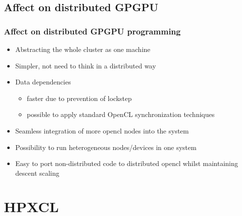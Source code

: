 \documentclass{beamer}
\begin{document}
\subsection{Affect on distributed GPGPU}
\begin{comment}
    this slide answers the question:
        what can we achieve with hpx now?
        data dependencies: due to extensive use of futures
        sync techniques of std opencl: events, data dependencies.
        someone who already knows opencl will adapt easily to the new system
\end{comment}
\begin{frame}
    \frametitle{Affect on distributed GPGPU programming}
    \begin{itemize}
        \item Abstracting the whole cluster as one machine
        \item Simpler, not need to think in a distributed way
        \item Data dependencies
        \begin{itemize}
            \item faster due to prevention of lockstep
            \item possible to apply standard OpenCL synchronization techniques
        \end{itemize}
        \item Seamless integration of more opencl nodes into the system
        \item Possibility to run heterogeneous nodes/devices in one system
        \item Easy to port non-distributed code to distributed opencl whilst
              maintaining descent scaling
    \end{itemize}
\end{frame}

\section{HPXCL}
\end{document}
